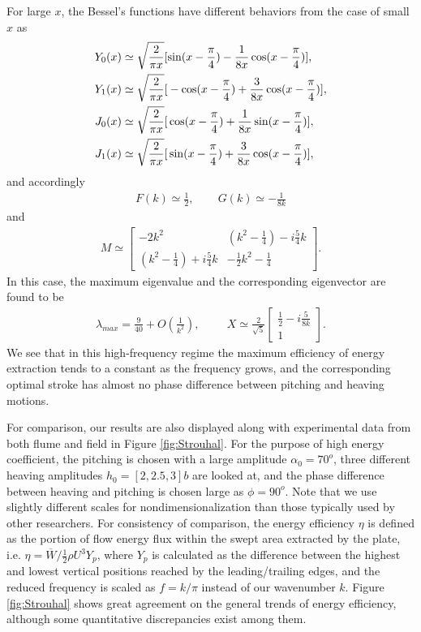 For large $x$, the Bessel's functions have different behaviors from the case of small $x$ as
\begin{align}
Y_0(x) & \simeq  \sqrt{\frac{2}{\pi x}} [ \sin (x-\frac{\pi}{4}) - \frac{1}{8x} \cos (x - \frac{\pi}{4}) ], \\
Y_1(x) & \simeq  \sqrt{\frac{2}{\pi x}} \large{[} -\cos (x-\frac{\pi}{4})+\frac{3}{8x} \cos (x - \frac{\pi}{4}) \large{]}, \\
J_0(x) & \simeq  \sqrt{\frac{2}{\pi x}} \large{[} \cos (x-\frac{\pi}{4}) + \frac{1}{8x} \sin (x - \frac{\pi}{4}) \large{]}, \\
J_1(x) & \simeq  \sqrt{\frac{2}{\pi x}} \large{[} \sin (x-\frac{\pi}{4}) + \frac{3}{8x} \cos (x - \frac{\pi}{4}) \large{]},
\end{align}
and accordingly
\begin{align}
F(k) \simeq \frac{1}{2},   \hspace{25pt}  G(k) \simeq -\frac{1}{8k}
\end{align}
and
\begin{align}
M \simeq \begin{bmatrix}   -2k^2   &  (k^2 - \frac{1}{4}) - i\frac{5}{4}k  \\
                        (k^2 - \frac{1}{4}) + i\frac{5}{4}k &   -\frac{1}{2}k^2 - \frac{1}{4}  \end{bmatrix}.
\end{align}
In this case, the maximum eigenvalue and the corresponding eigenvector are found to be
\begin{align}
\lambda_{max} = \frac{9}{40} + O(\frac{1}{k^2}), \hspace{1cm}
X \simeq \frac{2}{\sqrt{5}}
\begin{bmatrix} \frac{1}{2} - i \frac{5}{8k}   \\     1     \end{bmatrix}.
\end{align}
We see that in this high-frequency regime the maximum efficiency of energy extraction tends to a constant as the frequency grows, and the corresponding optimal stroke has almost no phase difference between pitching and heaving motions.

For comparison, our results are also displayed along with experimental data from both flume and field in Figure \ref{fig:Strouhal}.
For the purpose of high energy coefficient, the pitching is chosen with a large amplitude $\alpha_0 = 70^o$, three different heaving amplitudes $h_0 = [2, 2.5, 3]b$ are looked at, and the phase difference between heaving and pitching is chosen large as $\phi = 90^o$.
Note that we use slightly different scales for nondimensionalization than those typically used by other researchers.
For consistency of comparison, the energy efficiency $\eta$ is defined as the portion of flow energy flux within the swept area extracted by the plate, i.e. $\eta = \overline{W} / \frac{1}{2} \rho U^3 Y_p$, where $Y_p$ is calculated as the difference between the highest and lowest vertical positions reached by the leading/trailing edges, and the reduced frequency is scaled as $f = k/\pi$ instead of our wavenumber $k$.
Figure \ref{fig:Strouhal} shows great agreement on the general trends of energy efficiency, although some quantitative discrepancies exist among them.

